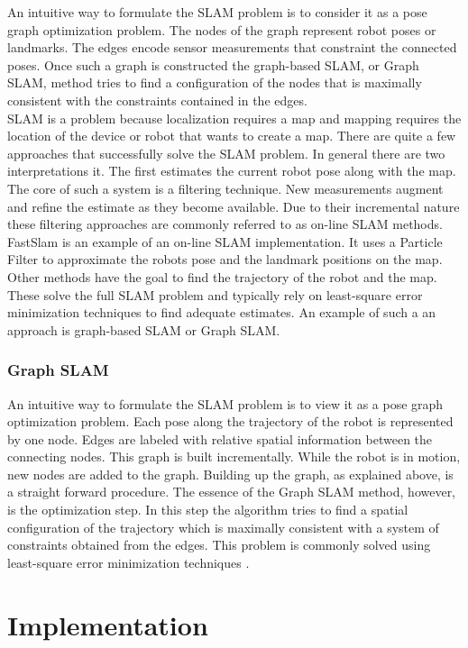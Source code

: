 \documentclass{ba-kecs}
\begin{document}
An intuitive way to formulate the SLAM problem is to consider it as a pose graph optimization problem. The nodes of the graph represent robot poses or landmarks. The edges encode sensor measurements that constraint the connected poses. Once such a graph is constructed the graph-based SLAM, or Graph SLAM, method tries to find a configuration of the nodes that is maximally consistent with the constraints contained in the edges.\\

SLAM is a problem because localization requires a map and mapping requires the location of the device or robot that wants to create a map. There are quite a few approaches that successfully solve the SLAM problem. 
In general there are two interpretations it. The first estimates the current robot pose along with the map. The core of such a system is a filtering technique. New measurements augment and refine the estimate as they become available. Due to their incremental nature these filtering approaches are commonly referred to as on-line SLAM methods. FastSlam \citep{Montemerlo02} is an example of an on-line SLAM implementation. It uses a Particle Filter to approximate the robots pose and the landmark positions on the map. Other methods have the goal to find the trajectory of the robot and the map. These solve the full SLAM problem and typically rely on least-square error minimization techniques \cite{Leastsquares} to find adequate estimates.  
An example of such a an approach is graph-based SLAM or Graph SLAM.

\subsubsection{Graph SLAM}
An intuitive way to formulate the SLAM problem is to view it as a pose graph optimization problem. Each pose along the trajectory of the robot is represented by one node. Edges are labeled with relative spatial information between the connecting nodes. This graph is built incrementally. While the robot is in motion, new nodes are added to the graph. Building up the graph, as explained above, is a straight forward procedure. The essence of the Graph SLAM method, however, is the optimization step. In this step the algorithm tries to find a spatial configuration of the trajectory which is maximally consistent with a system of constraints obtained from the edges. This problem is commonly solved using least-square error minimization techniques \citep{Grisetti}.

\section{Implementation}
\label{sec:impl}
\end{document}
